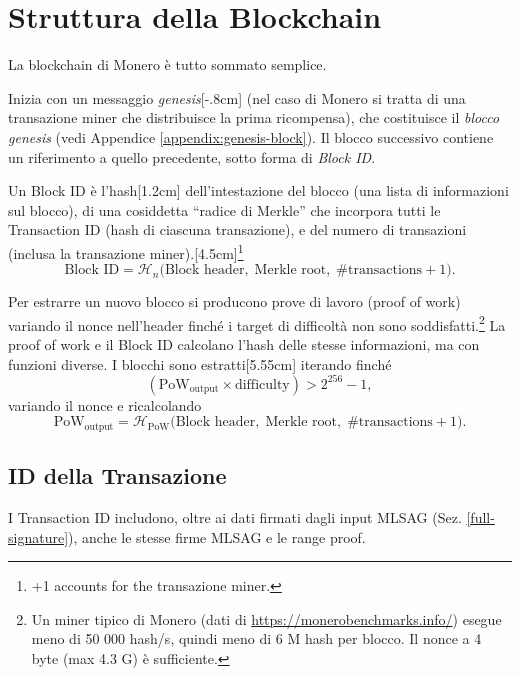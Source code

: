 \section{Struttura della Blockchain}
\label{sec:blockchain-structure}

La blockchain di Monero è tutto sommato semplice.

Inizia con un messaggio \emph{genesis}[-.8cm] (nel caso di Monero si tratta di una transazione miner che distribuisce la prima ricompensa), che costituisce il \emph{blocco genesis} (vedi Appendice \ref{appendix:genesis-block}). Il blocco successivo contiene un riferimento a quello precedente, sotto forma di \emph{Block ID}.

Un Block ID è l’hash[1.2cm] dell’intestazione del blocco (una lista di informazioni sul blocco), di una cosiddetta “radice di Merkle” che incorpora tutti le Transaction ID (hash di ciascuna transazione), e del numero di transazioni (inclusa la transazione miner).[4.5cm]\footnote{+1 accounts for the transazione miner.}\vspace{.175cm}
\[
  \text{Block ID}
    = \mathcal{H}_n\bigl(\text{Block header},\;\text{Merkle root},\;\#\text{transactions}+1\bigr).
\]

Per estrarre un nuovo blocco si producono prove di lavoro (proof of work) variando il nonce nell’header finché i target di difficoltà non sono soddisfatti.\footnote{Un miner tipico di Monero (dati di \url{https://monerobenchmarks.info/}) esegue meno di 50 000 hash/s, quindi meno di 6 M hash per blocco. Il nonce a 4 byte (max 4.3 G) è sufficiente.} La proof of work e il Block ID calcolano l'hash delle stesse informazioni, ma con funzioni diverse. I blocchi sono estratti[5.55cm] iterando finché 
\[
  (\text{PoW}_{\text{output}} \times \text{difficulty}) > 2^{256}-1,
\]
variando il nonce e ricalcolando\vspace{.175cm}
\[
  \text{PoW}_{\text{output}}
    = \mathcal{H}_{\text{PoW}}\bigl(\text{Block header},\;\text{Merkle root},\;\#\text{transactions}+1\bigr).
\]


\subsection{ID della Transazione}
\label{subsec:transaction-id} %
I Transaction ID includono, oltre ai dati firmati dagli input MLSAG (Sez. \ref{full-signature}), anche le stesse firme MLSAG e le range proof.

